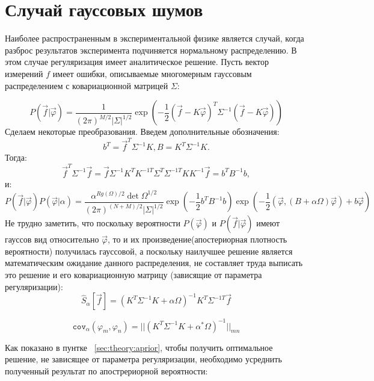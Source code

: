 \section{Случай гауссовых шумов}

Наиболее распространенным в экспериментальной физике является случай, когда разброс результатов эксперимента подчиняется нормальному распределению. В этом случае регуляризация имеет аналитическое решение.
Пусть вектор измерений $f$ имеет ошибки, описываемые многомерным гауссовым распределением с ковариационной матрицей $\Sigma$:

\begin{equation}
P(\vec{f}|\vec{\varphi}) = \frac{1}{(2\pi)^{M/2}|\Sigma|^{1/2}} \exp(-\frac{1}{2}(\vec{f} - K\vec{\varphi})^T\Sigma^{-1}(\vec{f} - K\vec{\varphi}))
\label{eq:gaussP}
\end{equation}
Сделаем некоторые преобразования. Введем дополнительные обозначения: $$b^T = \vec{f}^T\Sigma^{-1}K,  B = K^T\Sigma^{-1}K.$$
Тогда: $$\vec{f}^T\Sigma^{-1}\vec{f} = \vec{f}\Sigma^{-1}K^{T}K^{-1T}\Sigma^{T}\Sigma^{-1T} KK^{-1}\vec{f} = b^{T}B^{-1}b,$$ и:
\begin{equation}
\label{eq:aposteoriphi}
P(\vec{f}|\vec{\varphi})P(\vec{\varphi}|\alpha) = \frac{\alpha^{Rg(\Omega)/2}\det\Omega^{1/2}}{(2\pi)^{(N+M)/2}|\Sigma|^{1/2}}\exp(-\frac{1}{2}b^{T}B^{-1}b) \exp(-\frac{1}{2} (\vec{\varphi},(B+\alpha\Omega)\vec{\varphi}) + b\vec{\varphi})
\end{equation}
Не трудно заметить, что поскольку вероятности $P(\vec{\varphi})$ и $P(\vec{f}|\vec{\varphi})$ имеют гауссов вид относительно $\vec{\varphi}$, то и их произведение(апостериорная плотность вероятности) получилась гауссовой, а поскольку наилучшее решение является математическим ожидание данного распределения, не составляет труда выписать это решение и его ковариационную матрицу (зависящие от параметра регуляризации):
\begin{equation} \label{eq:analit_solv}
\hat{S}_{\alpha}[\vec{f}] = (K^T\Sigma^{-1}K+\alpha\Omega)^{-1}K^T\Sigma^{-1T}\vec{f}
\end{equation}

\begin{equation} \label{eq:analit_var}
\texttt{cov}_{\alpha}(\varphi_m, \varphi_n) = ||(K^T\Sigma^{-1}K+\alpha^*\Omega)^{-1}||_{mn}
\end{equation}

Как показано в пунтке ~\ref{sec:theory:aprior}, чтобы получить оптимальное решение, не зависящее от параметра регуляризации, необходимо усреднить полученный результат по апострериорной вероятности:

